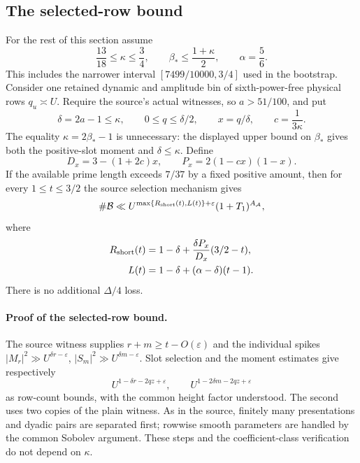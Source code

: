 \documentclass[11pt,a4paper]{article}
\numberwithin{equation}{section}
\theoremstyle{remark}
\begin{document}
\subsection{The selected-row bound}
For the rest of this section assume
\begin{equation}\label{eq:audit-count-range}
 \frac{13}{18}\le\kappa\le\frac34,
 \qquad \beta_*\le\frac{1+\kappa}{2},
 \qquad \alpha=\frac56.
\end{equation}
This includes the narrower interval $[7499/10000,3/4]$ used in the
bootstrap.  Consider one retained dynamic and amplitude bin of
sixth-power-free physical rows $q_u\asymp U$.  Require the source's
actual witnesses, so $a>51/100$, and put
\[
 \delta=2a-1\le\kappa,\qquad
 0\le q\le\delta/2,\qquad x=q/\delta,\qquad
 c=\frac1{3\kappa}.
\]
The equality $\kappa=2\beta_*-1$ is unnecessary: the displayed upper
bound on $\beta_*$ gives both the positive-slot moment and
$\delta\le\kappa$.  Define
\begin{equation}\label{eq:audit-DP}
 D_x=3-(1+2c)x,\qquad P_x=2(1-cx)(1-x).
\end{equation}
If the available prime length exceeds $7/37$ by a fixed positive
amount, then for every $1\le t\le3/2$ the source selection mechanism gives
\begin{equation}\label{eq:audit-row-count}
 \#\mathcal B\ll
 U^{\max\{R_{\rm short}(t),L(t)\}+\varepsilon}
 (1+T_1)^{A_{\mathcal A}},
\end{equation}
where
\begin{align}
 R_{\rm short}(t)&=1-\delta+
       \frac{\delta P_x}{D_x}(3/2-t),\label{eq:audit-short}\\
 L(t)&=1-\delta+(\alpha-\delta)(t-1).
 \label{eq:audit-long}
\end{align}
There is no additional $\Delta/4$ loss.

\paragraph{Proof of the selected-row bound.}
The source witness supplies $r+m\ge t-O(\varepsilon)$ and the individual
spikes $|M_r|^2\gg U^{\delta r-\varepsilon}$,
$|S_m|^2\gg U^{\delta m-\varepsilon}$.  Slot selection and the moment
estimates give respectively
\[
 U^{1-\delta r-2qz+\varepsilon},\qquad
 U^{1-2\delta m-2qz+\varepsilon}
\]
as row-count bounds, with the common height factor understood.  The second
uses two copies of the plain witness.  As in the source, finitely many
presentations and dyadic pairs are separated first; rowwise smooth
parameters are handled by the common Sobolev argument.  These steps and
the coefficient-class verification do not depend on $\kappa$.
\end{document}
